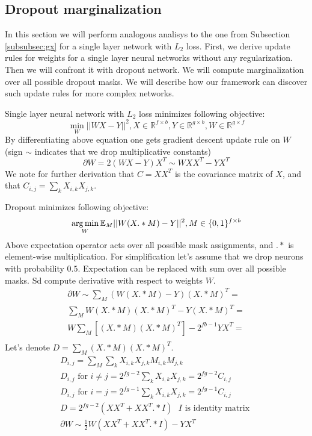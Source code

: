 \subsection{Dropout marginalization}\label{sec:dropout}
In this section we will perform analogous analisys to the one from Subsection \ref{subsubsec:gx} 
for a single layer network with $L_2$ loss. 
First, we derive update rules for weights for a single layer neural networks without any regularization. Then
we will confront it with dropout network. We will compute marginalization over
all possible dropout masks.
We will describe how our framework can discover
such update rules for more complex networks.

Single layer neural network with $L_2$ loss minimizes following objective:
\begin{equation*}
  \min_W ||WX - Y||^2, X \in \mathbb{R}^{f \times b}, Y \in \mathbb{R}^{g \times b}, W \in \mathbb{R}^{g \times f}
\end{equation*}
By differentiating above equation one gets gradient descent update rule
on $W$ (sign $\sim$ indicates that we drop multiplicative constants)
\begin{equation*}
 \partial W = 2(WX - Y)X^T \sim WXX^T - YX^T
\end{equation*}
We note for further derivation that $C = XX^T$ is the covariance matrix of
$X$, and that $C_{i,j} = \sum_k X_{i, k}X_{j, k}$.


Dropout minimizes following objective:
\begin{equation*}
  \operatorname*{arg\,min}_W \mathbb{E}_M ||W(X .* M) - Y||^2, M \in \{0, 1\}^{f \times b}
\end{equation*}
Above expectation operator acts over all possible mask assignments, and $.*$ is 
element-wise multiplication. For simplification
let's assume that we drop neurons with probability $0.5$. Expectation
can be replaced with sum over all possible masks. Sd compute
derivative with respect to weights $W$. 
\begin{align*}
  \partial W \sim \sum_M (W(X .* M) - Y)(X .* M)^T = \\
  \sum_M W(X .* M)(X .* M)^T - Y(X .* M)^T = \\
  W\sum_M [(X .* M)(X .* M)^T] - 2^{fb - 1}YX^T= \\
\end{align*}
Let's denote $D = \sum_M (X .* M)(X .* M)^T$. 
\begin{align*}
  D_{i,j} = \sum_M \sum_k X_{i, k} X_{j, k} M_{i, k} M_{j, k} \\
  D_{i,j} \text{ for } i \neq j = 2^{fg - 2} \sum_k X_{i, k} X_{j, k} = 2^{fg - 2}C_{i, j} \\
  D_{i,j} \text{ for } i = j = 2^{fg - 1} \sum_k X_{i, k} X_{j, k} = 2^{fg - 1}C_{i, j} \\
  D = 2^{fg - 2}(XX^T + XX^T .* I) \text { $I$ is identity matrix } \\
  \partial W \sim \frac{1}{2}W (XX^T + XX^T .* I) - YX^T
\end{align*}

